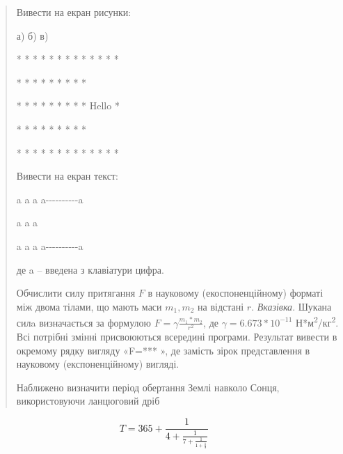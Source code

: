 \documentclass[]{article}
\begin{document}
\begin{quote}
Вивести на екран рисунки:

а) б) в)

* * * * * * * * * * * * *

* * * * * * * * *

* * * * * * * * * Hello *

* * * * * * * * *

* * * * * * * * * * * * *

Вивести на екран текст:

a a a a-\/-\/-\/-\/-\/-\/-\/-\/-\/-a

a a \textbar{} a \textbar{}

a a a a-\/-\/-\/-\/-\/-\/-\/-\/-\/-a

де a -- введена з клавіатури цифра.

Обчислити силу притягання $F$ в науковому (екоспоненційному) форматі між двома тілами,
  що мають маси $m_{1},m_{2}$ на відстані $r$. 
  \emph{\emph{Вказівка}}. Шукана силa визначається за формулою 
  $ F=\gamma \frac{m_{1}*m_{2}}{r^{2}}$,
  де $\gamma = 6.673*10^{-11}$ Н*м\textsuperscript{2}/кг\textsuperscript{2}. Всі потрібні змінні
  присвоюються всередині програми. Результат вивести в окремому рядку
  вигляду «F=*** », де замість зірок представлення в науковому
  (експоненційному) вигляді.

Наближено визначити період обертання Землі навколо Сонця, використовуючи
ланцюговий дріб
\end{quote}

\[T = \mathrm{365} + \frac{1}{4 + \frac{1}{7 + \frac{1}{1 + \frac{1}{3}}}}\]
\end{document}
